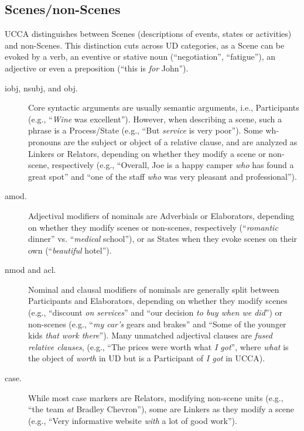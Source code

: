 \documentclass[11pt,a4paper]{article}
\begin{document}
\subsection{Scenes/non-Scenes}\label{sec:scenes}

UCCA distinguishes between Scenes (descriptions of events, states or activities)
and non-Scenes. 
This distinction cuts across UD categories,
as a Scene can be evoked by a verb, an eventive or stative
noun (``negotiation'', ``fatigue''),
an adjective or even a preposition (``this is \textit{for} John'').
\begin{description}
    \item[iobj, nsubj, and obj.]
    Core syntactic arguments are usually semantic arguments,
    i.e., Participants (e.g., ``\textit{Wine} was excellent'').
    However, when describing a scene, such a phrase is a Process/State
    (e.g., ``But \textit{service} is very poor'').
    Some wh-pronouns are the subject or object of a relative clause, and
    are analyzed as Linkers or Relators,
    depending on whether they modify a scene or non-scene, respectively
    (e.g., ``Overall, Joe is a happy camper \textit{who} has found a great spot''
    and ``one of the staff \textit{who} was very pleasant and professional'').
    \item[amod.]
    Adjectival modifiers of nominals are Adverbials or Elaborators,
    depending on whether they modify scenes or non-scenes, respectively
    (``\textit{romantic} dinner'' vs. ``\textit{medical} school''), or
    as States when
    they evoke scenes on their own (``\textit{beautiful} hotel'').
    \item[nmod and acl.]
    Nominal and clausal modifiers of nominals
    are generally split between Participants and Elaborators,
    depending on whether they modify scenes
    (e.g., ``discount \textit{on services}'' and
    ``our decision \textit{to buy when we did}'')
    or non-scenes (e.g., ``\textit{my car's} gears and brakes'' and
    ``Some of the younger kids \textit{that work there}'').
    Many unmatched adjectival clauses are
    \textit{fused relative clauses},
    (e.g., ``The prices were worth what \textit{I got}'',
    where \textit{what} is the object of \textit{worth} in UD but
    is a Participant of \textit{I got} in UCCA).
    \item[case.]
    While most case markers are Relators,
    modifying non-scene units (e.g., ``the team \textit{at} Bradley Chevron''),
    some are Linkers as they modify a scene
    (e.g., ``Very informative website \textit{with} a lot of good work'').

\end{description}
\end{document}
